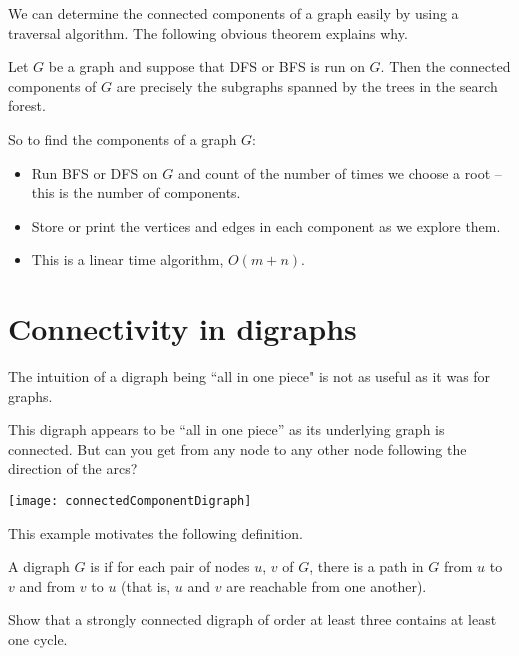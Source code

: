 We can determine the connected components of a graph easily by using a
traversal algorithm. The following obvious theorem explains why.

\begin{Theorem} \label{thm:trav-comps}
Let $G$ be a graph and suppose that DFS or BFS is run on $G$. Then the
connected components of $G$ are precisely the subgraphs spanned by the
trees in the search forest. 
\end{Theorem}

So to find the components of a graph $G$:
\begin{itemize}
\item Run BFS or DFS on $G$ and count of the number of times we choose a root -- this is the number of components.
\item Store or print the vertices and edges in each component as we explore them.
\item This is a linear time algorithm, $O(m+n)$.
\end{itemize}

\section{Connectivity in digraphs}
The intuition of a digraph being ``all in one piece" is not as useful as it was for graphs. 

\begin{Boxample}[0]
This digraph appears to be ``all in one piece'' as its underlying graph is connected. 
But can you get from any node to any other node following the direction of the arcs?
\begin{center}
\texttt{[image: connectedComponentDigraph]}
\end{center}
\end{Boxample}

This example motivates the following definition.

\begin{Definition}
A digraph $G$ is  if for each pair of nodes $u$, $v$ 
of $G$, there is a path in $G$ from $u$ to $v$ and from $v$ to $u$ (that is, $u$ and $v$ are reachable from one another).
\end{Definition}

\begin{Boxample}[4]
Show that a strongly connected digraph of order at least three contains at least one cycle.
\end{Boxample}

